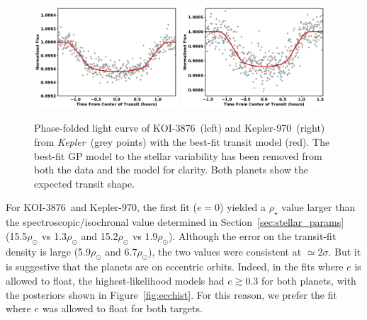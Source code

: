 \documentclass[twocolumn, linenumbers]{aastex631}
\newcommand{\starname}{KOI-3876}
\newcommand{\starnametwo}{Kepler-970}
\newcommand{\kepler}{{\it Kepler}}
\begin{document}
\begin{figure}[tbh]
    \centering
    \includegraphics[width=0.48\textwidth]{KOI3876LC1.pdf}
    \includegraphics[width=0.48\textwidth]{Kepler970LC1.pdf}
    \caption{Phase-folded light curve of \starname\ (left) and \starnametwo\ (right) from \kepler\ (grey points) with the best-fit transit model (red). The best-fit GP model to the stellar variability has been removed from both the data and the model for clarity. Both planets show the expected transit shape.}
    \label{fig:ecctransit}
\end{figure} 

For \starname\ and \starnametwo, the first fit ($e=0$) yielded a $\rho_{\star}$ value larger than the spectroscopic/isochronal value determined in Section~\ref{sec:stellar_params} (15.5$\rho_\odot$ vs 1.3$\rho_\odot$ and 15.2$\rho_\odot$ vs 1.9$\rho_\odot$). Although the error on the transit-fit density is large (5.9$\rho_\odot$ and 6.7$\rho_\odot$), the two values were consistent at $\simeq2\sigma$. But it is suggestive that the planets are on eccentric orbits. Indeed, in the fits where $e$ is allowed to float, the highest-likelihood models had $e\gtrsim0.3$ for both planets, with the posteriors shown in Figure~\ref{fig:ecchist}. For this reason, we prefer the fit where $e$ was allowed to float for both targets.  
\end{document}
